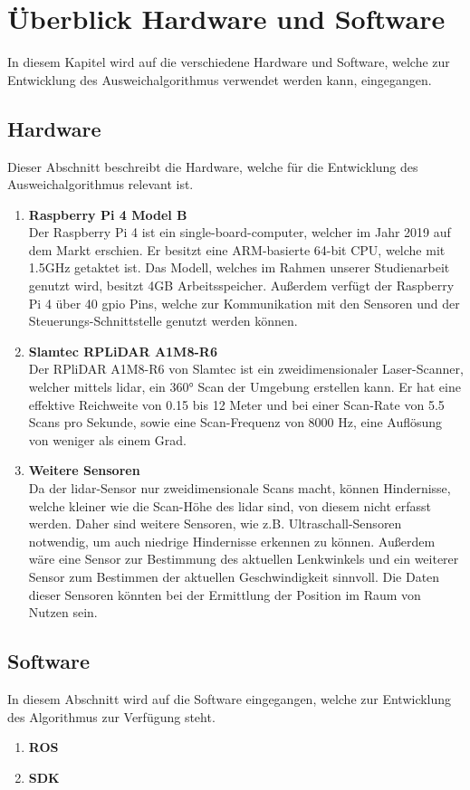 \section{Überblick Hardware und Software}
In diesem Kapitel wird auf die verschiedene Hardware und Software, welche zur Entwicklung des Ausweichalgorithmus verwendet werden kann, eingegangen.

\subsection{Hardware}
Dieser Abschnitt beschreibt die Hardware, welche für die Entwicklung des Ausweichalgorithmus relevant ist. 

\begin{enumerate}
    \item \textbf{Raspberry Pi 4 Model B} \\
    Der Raspberry Pi 4 ist ein single-board-computer, welcher im Jahr 2019 auf dem Markt erschien. Er besitzt eine ARM-basierte 64-bit CPU, welche mit 1.5GHz getaktet ist. Das Modell, welches im Rahmen unserer Studienarbeit genutzt wird, besitzt 4GB Arbeitsspeicher. Außerdem verfügt der Raspberry Pi 4 über 40 \acf{gpio} Pins, welche zur Kommunikation mit den Sensoren und der Steuerungs-Schnittstelle genutzt werden können. \cite{RasPi2023}

    \item \textbf{Slamtec RPLiDAR A1M8-R6} \\
    Der RPliDAR A1M8-R6 von Slamtec ist ein zweidimensionaler Laser-Scanner, welcher mittels \acf{lidar}, ein 360° Scan der Umgebung erstellen kann. \cite[p. 3]{Slamtec2020}
    Er hat eine effektive Reichweite von 0.15 bis 12 Meter und bei einer Scan-Rate von 5.5 Scans pro Sekunde, sowie eine Scan-Frequenz von 8000 Hz, eine Auflösung von weniger als einem Grad. \cite[p. 8]{Slamtec2020}
    
    \item \textbf{Weitere Sensoren} \\
    Da der \ac{lidar}-Sensor nur zweidimensionale Scans macht, können Hindernisse, welche kleiner wie die Scan-Höhe des \ac{lidar} sind, von diesem nicht erfasst werden. Daher sind weitere Sensoren, wie z.B. Ultraschall-Sensoren notwendig, um auch niedrige Hindernisse erkennen zu können. Außerdem wäre eine Sensor zur Bestimmung des aktuellen Lenkwinkels und ein weiterer Sensor zum Bestimmen der aktuellen Geschwindigkeit sinnvoll. Die Daten dieser Sensoren könnten bei der Ermittlung der Position im Raum von Nutzen sein. 
\end{enumerate}

\subsection{Software}
In diesem Abschnitt wird auf die Software eingegangen, welche zur Entwicklung des Algorithmus zur Verfügung steht.

\begin{enumerate}
    \item \textbf{ROS} \\
    

    \item \textbf{SDK} \\
    

\end{enumerate}

\newpage
